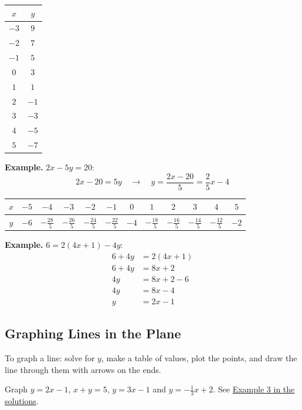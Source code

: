 \documentclass[letter]{article}
\newcommand{\exbox}[1]{\fbox{\textbf{Example #1}}}
\newcommand{\chp}{}
\newcommand{\seesol}[1]{See \hyperref[sec:\chp ex#1]{Example #1 in the solutions}.}
\begin{document}
\begin{center}
\begin{tabular}{c|c}
$x$ & $y$\\\hline
$-3$ & $9$\\
$-2$ & $7$\\
$-1$ & $5$\\
$0$ & $3$\\
$1$ & $1$\\
$2$ & $-1$\\
$3$ & $-3$\\
$4$ & $-5$\\
$5$ & $-7$
\end{tabular}
\end{center}

\textbf{Example.} $2x-5y=20$:
\[2x-20=5y\quad\to\quad y=\frac{2x-20}5=\frac25x-4\]
\begin{center}
\begin{tabular}{c|c|c|c|c|c|c|c|c|c|c|c}
$x$ & $-5$ & $-4$ & $-3$ & $-2$ & $-1$ & $0$ & $1$ & $2$ & $3$ & $4$ & $5$\\\hline
$y$ & $-6$ & $-\frac{28}5$ & $-\frac{26}5$ & $-\frac{24}5$ & $-\frac{22}5$ & $-4$ & $-\frac{18}5$ & $-\frac{16}5$ & $-\frac{14}5$ & $-\frac{12}5$ & $-2$
\end{tabular}
\end{center}

\textbf{Example.} $6=2(4x+1)-4y$:
\begin{align*}
  6+4y&=2(4x+1)\\
  6+4y&=8x+2\\
  4y&=8x+2-6\\
  4y&=8x-4\\
  y&=2x-1
\end{align*}

\subsection{Graphing Lines in the Plane}

To graph a line: solve for $y$, make a table of values, plot the points, and draw the line through them with arrows on the ends.

\exbox{3} Graph $y=2x-1$, $x+y=5$, $y=3x-1$ and $y=-\frac13x+2$. \seesol{3}
\end{document}

